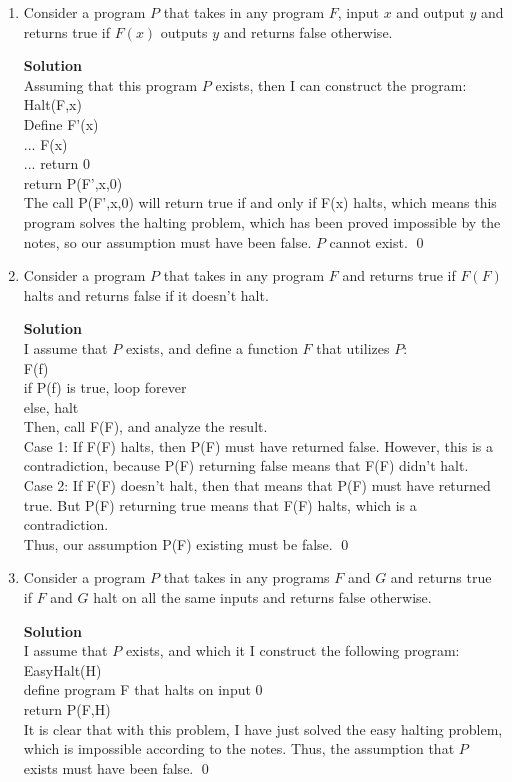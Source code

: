 \documentclass[11pt]{article}
\newenvironment{Parts}{\begin{enumerate}[label=(\alph*)]}{\end{enumerate}}
\newcommand*{\Part}{\item}
\begin{document}
\begin{Parts}

\Part
Consider a program $P$ that takes in any program $F$, input $x$ and output $y$ and returns true if
$F(x)$ outputs $y$ and returns false otherwise.
\begin{mdframed} \textbf{Solution} \\
Assuming that this program $P$ exists, then I can construct the program: \\
Halt(F,x) \\
Define F'(x) \\
... F(x) \\
... return 0 \\
return P(F',x,0) \\
The call P(F',x,0) will return true if and only if F(x) halts, which means this program solves the halting problem, which has been proved impossible by the notes, so our assumption must have been false. $P$ cannot exist. \qed
\end{mdframed}

\Part
Consider a program $P$ that takes in any program $F$ and returns true if $F(F)$ halts and returns
false if it doesn't halt.
\begin{mdframed} \textbf{Solution} \\
I assume that $P$ exists, and define a function $F$ that utilizes $P$: \\
F(f) \\
if P(f) is true, loop forever \\
else, halt \\
Then, call F(F), and analyze the result. \\
Case 1: If F(F) halts, then P(F) must have returned false. However, this is a contradiction, because P(F) returning false means that F(F) didn't halt. \\
Case 2: If F(F) doesn't halt, then that means that P(F) must have returned true. But P(F) returning true means that F(F) halts, which is a contradiction. \\
Thus, our assumption P(F) existing must be false. \qed
\end{mdframed}

\Part
Consider a program $P$ that takes in any programs $F$ and $G$ and returns true if $F$ and $G$ halt
on all the same inputs and returns false otherwise.
\begin{mdframed} \textbf{Solution} \\
I assume that $P$ exists, and which it I construct the following program: \\
EasyHalt(H) \\
define program F that halts on input 0 \\
return P(F,H) \\
It is clear that with this problem, I have just solved the easy halting problem, which is impossible according to the notes. Thus, the assumption that $P$ exists must have been false. \qed
\end{mdframed}

\end{Parts}
\end{document}
